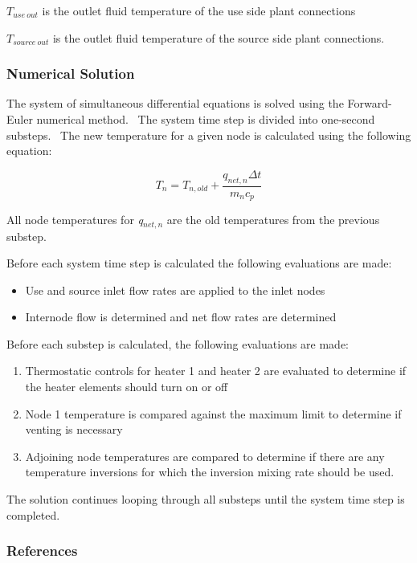 \(T_{use~out}\) is the outlet fluid temperature of the use side plant connections

\(T_{source~out}\) is the outlet fluid temperature of the source side plant connections.

\subsubsection{Numerical Solution}\label{numerical-solution}

The system of simultaneous differential equations is solved using the Forward-Euler numerical method.~ The system time step is divided into one-second substeps.~ The new temperature for a given node is calculated using the following equation:

\begin{equation}
{T_n} = {T_{n,old}} + \frac{{{q_{net,n}}\Delta t}}{{{m_n}{c_p}}}
\end{equation}

All node temperatures for \emph{q\(_{net,n}\)} are the old temperatures from the previous substep.

Before each system time step is calculated the following evaluations are made:

\begin{itemize}
\item Use and source inlet flow rates are applied to the inlet nodes
\item Internode flow is determined and net flow rates are determined
\end{itemize}

Before each substep is calculated, the following evaluations are made:

\begin{enumerate}
\item Thermostatic controls for heater 1 and heater 2 are evaluated to determine if the heater elements should turn on or off
\item Node 1 temperature is compared against the maximum limit to determine if venting is necessary
\item Adjoining node temperatures are compared to determine if there are any temperature inversions for which the inversion mixing rate should be used.
\end{enumerate}

The solution continues looping through all substeps until the system time step is completed.

\subsubsection{References}\label{references-1-017}

